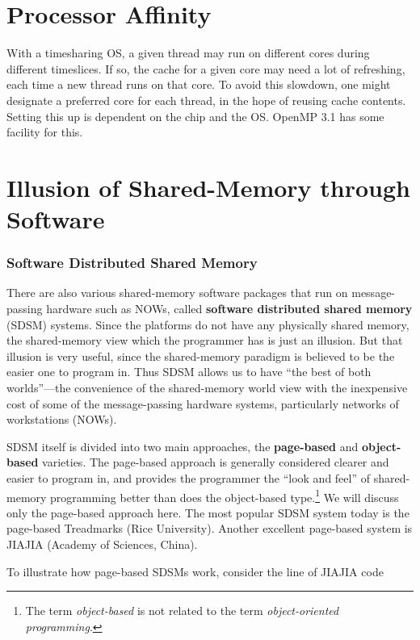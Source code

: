 \section{Processor Affinity}

With a timesharing OS, a given thread may run on different cores during
different timeslices.  If so, the cache for a given core may need a lot
of refreshing, each time a new thread runs on that core.  To avoid this
slowdown, one might designate a preferred core for each thread, in the
hope of reusing cache contents.  Setting this up is dependent on the
chip and the OS.  OpenMP 3.1 has some facility for this.

\section{Illusion of Shared-Memory through Software}
\label{sdsm}

\subsubsection{Software Distributed Shared Memory}

There are also various shared-memory software packages that run on
message-passing hardware such as NOWs, called \textbf{software
distributed shared memory} (SDSM) systems.  Since the platforms do not
have any physically shared memory, the shared-memory view which the
programmer has is just an illusion.  But that illusion is very useful,
since the shared-memory paradigm is believed to be the easier one to
program in.  Thus SDSM allows us to have ``the best of both
worlds''---the convenience of the shared-memory world view with the
inexpensive cost of some of the message-passing hardware systems,
particularly networks of workstations (NOWs).

SDSM itself is divided into two main approaches, the {\bf page-based}
and {\bf object-based} varieties.  The page-based approach is generally
considered clearer and easier to program in, and provides the programmer
the ``look and feel'' of shared-memory programming better than does the
object-based type.\footnote{The term {\it object-based} is not related
to the term {\it object-oriented programming}.}  We will discuss only
the page-based approach here.  The most popular SDSM system today is the
page-based Treadmarks (Rice University).  Another excellent page-based
system is JIAJIA (Academy of Sciences, China).

To illustrate how page-based SDSMs work, consider the line of JIAJIA code

